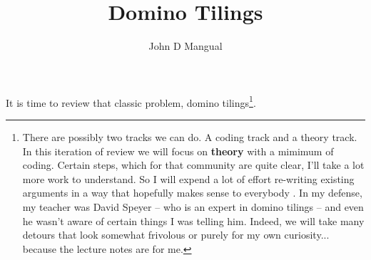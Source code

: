 \documentclass[12pt]{article}
\title{\textbf{ Domino Tilings }}
\author{John D Mangual}
\date{}
\begin{document}
\selectfont \fontsize{25}{30}\selectfont

\maketitle


\noindent It is time to review that classic problem, domino tilings\footnote{There are possibly two tracks we can do.  A coding track and a theory track.  In this iteration of review we will focus on \textbf{theory} with a mimimum of coding.   Certain steps, which for that community are quite clear, I'll take a lot more work to understand.  So I will expend a lot of effort re-writing existing arguments in a way that hopefully makes sense to everybody .  
In my defense, my teacher was David Speyer -- who is an expert in domino tilings -- and even he wasn't aware of certain things I was telling him.  Indeed, we will take many detours that look somewhat frivolous or purely for my own curiosity... because the lecture notes are for me.}.  
\end{document}
